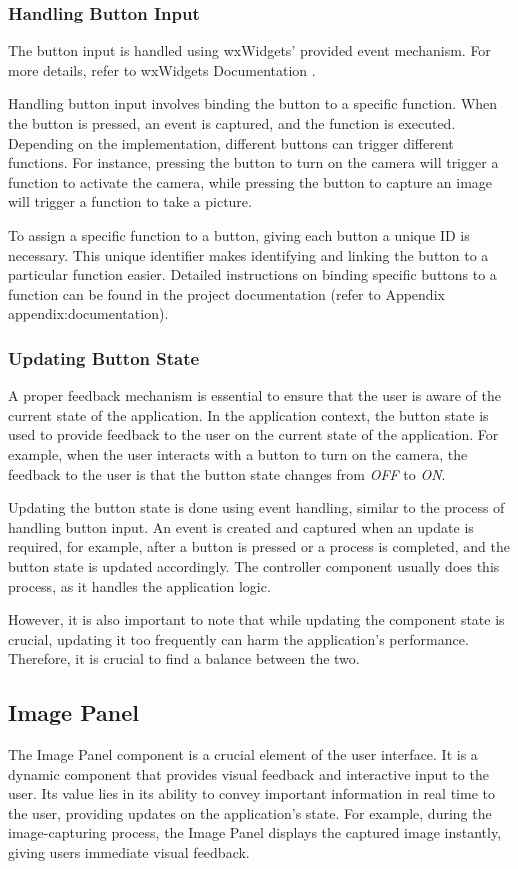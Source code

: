 \subsubsection{Handling Button Input}
\label{subsubsec:handling_button_input}
The button input is handled using wxWidgets' provided event mechanism. For more details, refer to wxWidgets Documentation \cite{wxWidgetsEvent}.

Handling button input involves binding the button to a specific function. When the button is pressed, an event is captured, and the function is executed. Depending on the implementation, different buttons can trigger different functions. For instance, pressing the button to turn on the camera will trigger a function to activate the camera, while pressing the button to capture an image will trigger a function to take a picture.

To assign a specific function to a button, giving each button a unique ID is necessary. This unique identifier makes identifying and linking the button to a particular function easier. Detailed instructions on binding specific buttons to a function can be found in the project documentation (refer to Appendix {appendix:documentation}).

\subsubsection{Updating Button State}
A proper feedback mechanism is essential to ensure that the user is aware of the current state of the application. In the application context, the button state is used to provide feedback to the user on the current state of the application. For example, when the user interacts with a button to turn on the camera, the feedback to the user is that the button state changes from \textit{OFF} to \textit{ON}.

Updating the button state is done using event handling, similar to the process of handling button input. An event is created and captured when an update is required, for example, after a button is pressed or a process is completed, and the button state is updated accordingly. The controller component usually does this process, as it handles the application logic.

However, it is also important to note that while updating the component state is crucial, updating it too frequently can harm the application's performance. Therefore, it is crucial to find a balance between the two.

\subsection{Image Panel}
\label{subsec:image_panel}
The Image Panel component is a crucial element of the user interface. It is a dynamic component that provides visual feedback and interactive input to the user. Its value lies in its ability to convey important information in real time to the user, providing updates on the application's state. For example, during the image-capturing process, the Image Panel displays the captured image instantly, giving users immediate visual feedback.

